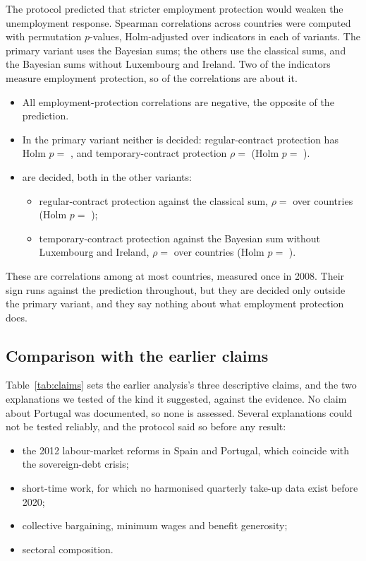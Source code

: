 The protocol predicted that stricter employment protection would weaken the unemployment
response. Spearman correlations across countries were computed with permutation $p$-values,
Holm-adjusted over  indicators in each of 
variants. The primary variant uses the Bayesian sums; the others use the classical sums,
and the Bayesian sums without Luxembourg and Ireland. Two of the indicators measure
employment protection, so  of the  correlations are about it.
\begin{itemize}
  \item All  employment-protection correlations are negative, the
    opposite of the prediction.
  \item In the primary variant neither is decided: regular-contract protection has Holm
    $p=$ , and temporary-contract protection $\rho=$
     (Holm $p=$ ).
  \item {} are decided, both in the other variants:
    \begin{itemize}
      \item regular-contract protection against the classical sum, $\rho=$
         over  countries (Holm $p=$
        );
      \item temporary-contract protection against the Bayesian sum without Luxembourg and
        Ireland, $\rho=$  over  countries
        (Holm $p=$ ).
    \end{itemize}
\end{itemize}
These are correlations among at most  countries, measured once in 2008.
Their sign runs against the prediction throughout, but they are decided only outside the
primary variant, and they say nothing about what employment protection does.

\subsection{Comparison with the earlier claims}

Table~\ref{tab:claims} sets the earlier analysis's three descriptive claims, and the two
explanations we tested of the kind it suggested, against the evidence. No claim about Portugal was documented, so none
is assessed. Several explanations could not be
tested reliably, and the protocol said so before any result:
\begin{itemize}
  \item the 2012 labour-market reforms in Spain and Portugal, which coincide with the
    sovereign-debt crisis;
  \item short-time work, for which no harmonised quarterly take-up data exist before 2020;
  \item collective bargaining, minimum wages and benefit generosity;
  \item sectoral composition.
\end{itemize}

